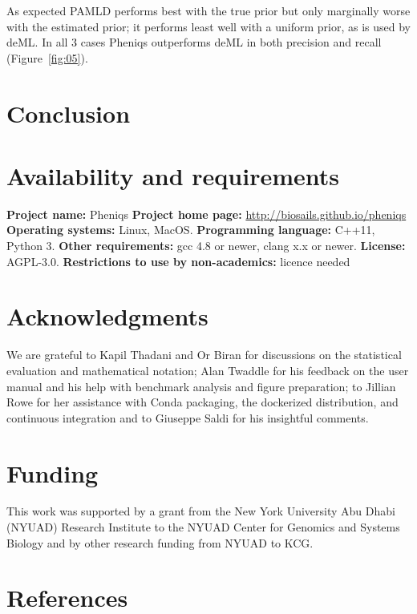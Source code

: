 \documentclass[10pt,twocolumn]{article}
\begin{document}
As expected PAMLD performs best with the true prior but only marginally worse with the estimated prior; it performs least well with a uniform prior, as is used by deML. In all 3 cases Pheniqs outperforms deML in both precision and recall (Figure~\ref{fig:05}).

\section*{Conclusion}
%
%
\section*{Availability and requirements}
\textbf{Project name:} Pheniqs
\textbf{Project home page:} \url{http://biosails.github.io/pheniqs}
\textbf{Operating systems:} Linux, MacOS.
\textbf{Programming language:} C++11, Python 3.
\textbf{Other requirements:} gcc 4.8 or newer, clang x.x or newer.
\textbf{License:} AGPL-3.0.
\textbf{Restrictions to use by non-academics:} licence needed

\section*{Acknowledgments}

We are grateful to Kapil Thadani and Or Biran for discussions on the statistical evaluation and mathematical notation; Alan Twaddle for his feedback on the user manual and his help with benchmark analysis and figure preparation; to Jillian Rowe for her assistance with Conda packaging, the dockerized distribution, and continuous integration and to Giuseppe Saldi for his insightful comments.

\section*{Funding}

This work was supported by a grant from the New York University Abu Dhabi (NYUAD) Research Institute to the NYUAD Center for Genomics and Systems Biology and by other research funding from NYUAD to KCG.

\section*{References}
\printbibliography[heading=none]
\end{document}
